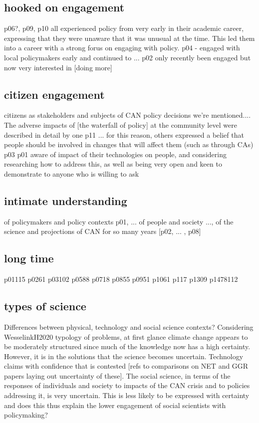 \subsection{hooked on engagement}
p06?, p09, p10 all experienced policy from very early in their academic career, expressing that they were unaware that it was unusual at the time. This led them into a career with a strong forus on engaging with policy. p04 - engaged with local policymakers early and continued to ... p02 only recently been engaged but now very interested in [doing more]

\subsection{citizen engagement}
citizens as stakeholders and subjects of CAN policy decisions we're mentioned.... The adverse impacts of [the waterfall of policy] at the community level were described in detail by one p11 ... for this reason, others expressed a belief that people should be involved in changes that will affect them (such as through CAs) p03  p01 aware of impact of their technologies on people, and considering researching how to address this, as well as being very open and keen to demonstrate to anyone who is willing to ask

\subsection{intimate understanding}
of policymakers and policy contexts p01, ...
of people and society ..., of the science and projections of CAN for so many years [p02, ... , p08]
\subsection{long time} {p01}{115} {p02}{61} {p03}{102} {p05}{88} {p07}{18} {p08}{55} {p09}{51} {p10}{61} {p11}{7} {p13}{09} {p14}{78}{112}

\subsection{types of science}
Differences between physical, technology and social science contexts?
Considering WesselinkH2020 typology of problems, at first glance climate change appears to be moderately structured since much of the knowledge now has a high certainty. However, it is in the solutions that the science becomes uncertain. Technology claims with confidence that is contested [refs to comparisons on NET and GGR papers laying out uncertainty of these]. The social science, in terms of the responses of individuals and society to impacts of the CAN crisis and to policies addressing it, is very uncertain. This is less likely to be expressed with certainty and does this thus explain the lower engagement of social scientists with policymaking?

